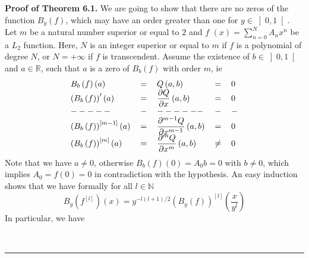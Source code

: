 \documentclass{article}
\newenvironment{proof}[1][Proof]{\textbf{#1.} }{\ \rule{0.5em}{0.5em}}
\begin{document}
\begin{proof}[Proof of Theorem 6.1]
\bigskip We are going to show that there are no zeros of the function $B_{y}\left( f\right) $, which may have an order greater than one for $y\in \left] 0,1\right[ $. Let $m$ be a natural number superior or equal to $2$
and $f$ $\left( x\right) =\sum_{n=0}^{N}A_{n}x^{n}$ be a $L_{2}$ function.
Here, $N$ is an integer superior or equal to $m$ if $f$ is a polynomial of
degree $N$, or $N=+\infty $ if $f$ is transcendent. Assume the existence of $b\in \left] 0,1\right[ $ and $a\in \mathbb{R}$, such that $a$ is a zero of $B_{b}\left( f\right) $ with order $m$, ie 
\begin{equation*}
\begin{tabular}{lllll}
$B_{b}\left( f\right) \left( a\right) $ & $=$ & $Q\left( a,b\right) $ & $=$
& $0$ \\ 
$\left( B_{b}\left( f\right) \right) ^{\prime }\left( a\right) $ & $=$ & $\dfrac{\partial Q}{\partial x}\left( a,b\right) $ & $=$ & $0$ \\ 
$-----$ & $-$ & $------$ & $-$ & $-$ \\ 
$\left( B_{b}\left( f\right) \right) ^{\left[ m-1\right] }\left( a\right) $
& $=$ & $\dfrac{\partial ^{m-1}Q}{\partial x^{m-1}}\left( a,b\right) $ & $=$
& $0$ \\ 
$\left( B_{b}\left( f\right) \right) ^{\left[ m\right] }\left( a\right) $ & $=$ & $\dfrac{\partial ^{m}Q}{\partial x^{m}}\left( a,b\right) $ & $\neq $ & $0$\end{tabular}
\end{equation*}
Note that we have $a\neq 0$, otherwise $B_{b}\left( f\right) \left( 0\right)
=A_{0}b=0$ with $b\neq 0$, which implies $A_{0}=f\left( 0\right) =0$ in
contradiction with the hypothesis. An easy induction shows that we have
formally for all $l\in \mathbb{N}$ 
\begin{equation*}
B_{y}\left( f^{\left[ l\right] }\right) \left( x\right) =y^{-l\left(
l+1\right) /2}\left( B_{y}\left( f\right) \right) ^{\left[ l\right] }\left( 
\dfrac{x}{y^{l}}\right) 
\end{equation*}
In particular, we have


\end{proof}
\end{document}
